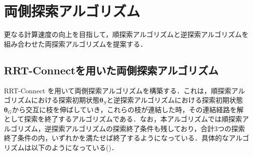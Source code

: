\documentclass[a4paper,twoside,12pt,papersize, dvipdfmx]{iirthesis}
\begin{document}
\section{両側探索アルゴリズム}\label{sec::planner::connect}
更なる計算速度の向上を目指して，順探索アルゴリズムと逆探索アルゴリズムを組み合わせた両探索アルゴリズムを提案する．
\subsection{RRT-Connectを用いた両側探索アルゴリズム}
RRT-Connect \cite{kuffner2000}を用いて両側探索アルゴリズムを構築する．これは，順探索アルゴリズムにおける探索初期状態$\bm {\theta}_S$と逆探索アルゴリズムにおける探索初期状態$\bm {\theta}_G$から交互に枝を伸ばしていき，これらの枝が連結した時，その連結経路を解として探索を終了するアルゴリズムである．なお，本アルゴリズムでは順探索アルゴリズム，逆探索アルゴリズムの探索終了条件も残しており，合計3つの探索終了条件の内，いずれかを満たせば終了するようになっている．具体的なアルゴリズムは以下のようになっている()．
\end{document}

